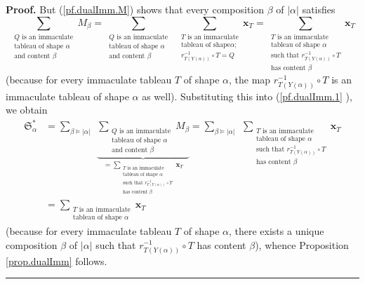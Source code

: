 \documentclass[numbers=enddot,12pt,final,onecolumn,notitlepage,abstracton]{scrartcl}%
\theoremstyle{definition}
\newenvironment{proof}[1][Proof]{\noindent\textbf{#1.} }{\ \rule{0.5em}{0.5em}}
\let\sumnonlimits\sum
\renewcommand{\sum}{\sumnonlimits\limits}
\begin{document}
\begin{proof}
But (\ref{pf.dualImm.M}) shows that every composition $\beta$ of $\left\vert
\alpha\right\vert $ satisfies%
\[
\sum_{\substack{Q\text{ is an immaculate}\\\text{tableau of shape }%
\alpha\\\text{and content }\beta}}M_{\beta}=\sum_{\substack{Q\text{ is an
immaculate}\\\text{tableau of shape }\alpha\\\text{and content }\beta
}}\ \ \sum_{\substack{T\text{ is an immaculate}\\\text{tableau of shape
}\alpha;\\r_{T\left(  Y\left(  \alpha\right)  \right)  }^{-1}\circ
T=Q}}\mathbf{x}_{T}=\sum_{\substack{T\text{ is an immaculate}\\\text{tableau
of shape }\alpha\\\text{such that }r_{T\left(  Y\left(  \alpha\right)
\right)  }^{-1}\circ T\\\text{has content }\beta}}\mathbf{x}_{T}%
\]
(because for every immaculate tableau $T$ of shape $\alpha$, the map
$r_{T\left(  Y\left(  \alpha\right)  \right)  }^{-1}\circ T$ is an immaculate
tableau of shape $\alpha$ as well). Substituting this into (\ref{pf.dualImm.1}%
), we obtain%
\begin{align*}
\mathfrak{S}_{\alpha}^{\ast}  &  =\sum_{\beta\models\left\vert \alpha
\right\vert }\ \ \underbrace{\sum_{\substack{Q\text{ is an immaculate}%
\\\text{tableau of shape }\alpha\\\text{and content }\beta}}M_{\beta}}%
_{=\sum_{\substack{T\text{ is an immaculate}\\\text{tableau of shape }%
\alpha\\\text{such that }r_{T\left(  Y\left(  \alpha\right)  \right)  }%
^{-1}\circ T\\\text{has content }\beta}}\mathbf{x}_{T}}=\sum_{\beta
\models\left\vert \alpha\right\vert }\ \ \sum_{\substack{T\text{ is an
immaculate}\\\text{tableau of shape }\alpha\\\text{such that }r_{T\left(
Y\left(  \alpha\right)  \right)  }^{-1}\circ T\\\text{has content }\beta
}}\mathbf{x}_{T}\\
&  =\sum_{\substack{T\text{ is an immaculate}\\\text{tableau of shape }\alpha
}}\mathbf{x}_{T}%
\end{align*}
(because for every immaculate tableau $T$ of shape $\alpha$, there exists a
unique composition $\beta$ of $\left\vert \alpha\right\vert $ such that
$r_{T\left(  Y\left(  \alpha\right)  \right)  }^{-1}\circ T$ has content
$\beta$), whence Proposition \ref{prop.dualImm} follows.
\end{proof}
\end{document}
